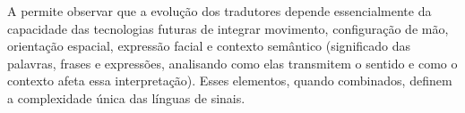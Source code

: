 \documentclass[portuguese]{textolivre}
\begin{document}
A  permite observar que a evolução dos tradutores depende essencialmente da capacidade das tecnologias futuras de integrar movimento, configuração de mão, orientação espacial, expressão facial e contexto semântico (significado das palavras, frases e expressões, analisando como elas transmitem o sentido e como o contexto afeta essa interpretação). Esses elementos, quando combinados, definem a complexidade única das línguas de sinais.

\end{document}
